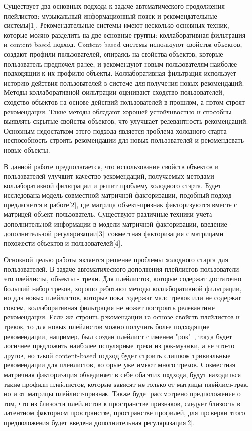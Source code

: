 \documentclass[12pt,twoside]{article}
\begin{document}
{Существует два основных подхода к задаче автоматического продолжения плейлистов: музыкальный информационный поиск и рекомендательные системы[1]. Рекомендательные системы имеют несколько основных техник, которые можно разделить на две основные группы: коллаборативная фильтрация и content-based подход. Content-based системы используют свойства объектов, создают профили пользователей, опираясь на свойства объектов, которые пользователь предпочел ранее,  и рекомендуют новым пользователям наиболее подходящии к их профилю объекты. Коллаборативная фильтрация использует историю действия пользователей в системе для получения новых рекомендаций. Методы коллаборативной фильтрации оценивают сходство пользователей, сходство объектов на основе действий пользователей в прошлом, а потом строят рекомендации. Такие методы обладают хорошей устойчивостью и способны выявлять скрытые свойства объектов, что улучшает релевантность рекомендаций. Основным недостатком этого подхода является проблема холодного старта - неспособность строить рекомендации для новых пользователей и рекомендовать новые объекты. 

В данной работе предполагается, что использование свойств объектов и пользователей улучшит качество рекомендаций, получаемых методами коллаборативной фильтрации и  решит проблему  холодного старта. Будет исследована модель совместной матричной факторизации, подобный подход предлагается в работе[2], где матрица объект-признак факторизуются вместе с матрицей объект-пользователь. Существуют различные техники учета дополнительной информации в модели матричной факторизации, введение дополнительной регуляризации[3], совместная факторизация с матрицами похожести объектов и пользователей[4]. 

Основной целью работы является решение проблемы холодного старта для пользователей. В задаче автоматического дополнения плейлистов пользователи это плейлисты, обьекты - треки. Для плейлистов, которые содержат достаточно больший набор треков, хорошо работают методы коллаборативной фильтрации, но для новых плейлистов, которые пока содержат мало треков или не содержат совсем, коллаборативная фильтрация не может построить релевантные рекомендации. Если же строить рекомендации на основе свойств плейлистов и треков, то для новых плейлистов можно получить более подходящие рекомендации, например, был создан плейлист с именем "рок"\ , тогда будет логичнее предложить наиболее популярные треки из рок-музыки, а не что-то другое, но такой content-based подход будет строить слишком тривиальные рекомендации для плейлистов, которые уже имеют много треков. Совместная матричная факторизация объединяет в себе оба этих подхода, будут находиться такие профили плейлистов, которые зависят не только от матрицы плейлист-трек, но и от матрицы плейлист-признак. Также будет рассмотрено предположение о том, что из близости плейлистов в пространстве признаков, следует близость в латентном факторном пространстве, пространстве профилей, для проверки этого предположения будет введена дополнительная регуляризация[2].}
\end{document}
